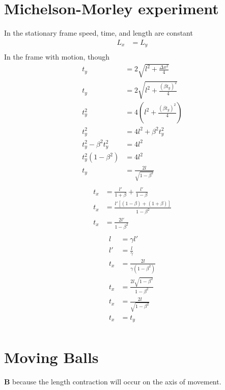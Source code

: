 \documentclass[11pt,letterpaper, twocolumn]{article}
\begin{document}
\section{Michelson-Morley experiment}
In the stationary frame speed, time, and length are constant
\begin{align*}
    L_x &= L_y\\
\end{align*}
In the frame with motion, though
\begin{align*}
    t_y &= 2\sqrt{l^2 + \frac{\Delta x^2}{4}}\\
    t_y &= 2\sqrt{l^2 + \frac{(\beta t_y)^2}{4}}\\
    t_y^2 &= 4({l^2 + \frac{(\beta t_y)^2}{4}})\\
    t_y^2 &= 4l^2 + \beta^2 t_y^2\\
    t_y^2 - \beta^2 t_y^2 &= 4l^2\\
    t_y^2 (1 - \beta^2)&= 4l^2\\
    t_y &= \frac{2l}{\sqrt{1-\beta^2}}\\
\end{align*}
\begin{align*}
    t_x &= \frac{l'}{1+\beta} + \frac{l'}{1-\beta} \\
    t_x &= \frac{l'[(1-\beta)+(1+\beta)]}{1-\beta^2}\\
    t_x &= \frac{2l'}{1-\beta^2}\\
\end{align*}
\begin{align*}
    l &= \gamma l'\\
    l' &= \frac{l}{\gamma}\\
    t_x &= \frac{2l}{\gamma(1-\beta^2)}\\
    t_x &= \frac{2l\sqrt{1-\beta^2}}{1-\beta^2}\\
    t_x &= \frac{2l}{\sqrt{1-\beta^2}}\\
    t_x &= t_y\\
\end{align*}


\section{Moving Balls}
\begin{center}\textbf{B} because the length contraction will occur on the axis of movement. \end{center}
\end{document}

